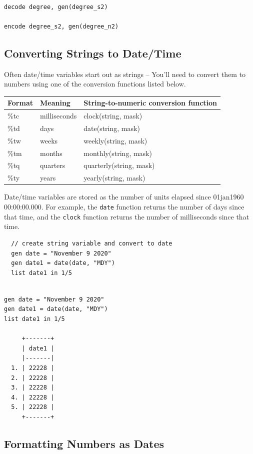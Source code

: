 \documentclass[]{book}
\begin{document}
\begin{verbatim}

decode degree, gen(degree_s2)

encode degree_s2, gen(degree_n2)
\end{verbatim}

\subsection{Converting Strings to
Date/Time}\label{converting-strings-to-datetime}

Often date/time variables start out as strings -- You'll need to convert
them to numbers using one of the conversion functions listed below.

\begin{longtable}[]{@{}lll@{}}
\toprule
Format & Meaning & String-to-numeric conversion function\tabularnewline
\midrule
\endhead
\%tc & milliseconds & clock(string, mask)\tabularnewline
\%td & days & date(string, mask)\tabularnewline
\%tw & weeks & weekly(string, mask)\tabularnewline
\%tm & months & monthly(string, mask)\tabularnewline
\%tq & quarters & quarterly(string, mask)\tabularnewline
\%ty & years & yearly(string, mask)\tabularnewline
\bottomrule
\end{longtable}

Date/time variables are stored as the number of units elapsed since
01jan1960 00:00:00.000. For example, the \texttt{date} function returns
the number of days since that time, and the \texttt{clock} function
returns the number of milliseconds since that time.

\begin{verbatim}
  // create string variable and convert to date
  gen date = "November 9 2020"
  gen date1 = date(date, "MDY")
  list date1 in 1/5
\end{verbatim}

\begin{verbatim}

gen date = "November 9 2020"
gen date1 = date(date, "MDY")
list date1 in 1/5

     +-------+
     | date1 |
     |-------|
  1. | 22228 |
  2. | 22228 |
  3. | 22228 |
  4. | 22228 |
  5. | 22228 |
     +-------+
\end{verbatim}

\subsection{Formatting Numbers as
Dates}\label{formatting-numbers-as-dates}
\end{document}
